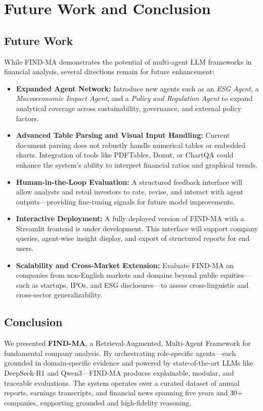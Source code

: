 \documentclass[11pt]{article}
\newcommand{\findma}{\textsc{FIND-MA}}
\begin{document}
\section{Future Work and Conclusion}
\label{sec:conclusion}
\subsection*{Future Work}
While \findma{} demonstrates the potential of multi-agent LLM frameworks in financial analysis, several directions remain for future enhancement:
\begin{itemize}
    \item \textbf{Expanded Agent Network:} Introduce new agents such as an \textit{ESG Agent}, a \textit{Macroeconomic Impact Agent}, and a \textit{Policy and Regulation Agent} to expand analytical coverage across sustainability, governance, and external policy factors.
    \item \textbf{Advanced Table Parsing and Visual Input Handling:} Current document parsing does not robustly handle numerical tables or embedded charts. Integration of tools like PDFTables, Donut, or ChartQA could enhance the system’s ability to interpret financial ratios and graphical trends.
    \item \textbf{Human-in-the-Loop Evaluation:} A structured feedback interface will allow analysts and retail investors to rate, revise, and interact with agent outputs—providing fine-tuning signals for future model improvements.
    \item \textbf{Interactive Deployment:} A fully deployed version of \findma{} with a Streamlit frontend is under development. This interface will support company queries, agent-wise insight display, and export of structured reports for end users.
    \item \textbf{Scalability and Cross-Market Extension:} Evaluate \findma{} on companies from non-English markets and domains beyond public equities—such as startups, IPOs, and ESG disclosures—to assess cross-linguistic and cross-sector generalizability.
\end{itemize}

\subsection*{Conclusion}
We presented \textbf{\findma{}}, a Retrieval-Augmented, Multi-Agent Framework for fundamental company analysis. By orchestrating role-specific agents—each grounded in domain-specific evidence and powered by state-of-the-art LLMs like DeepSeek-R1 and Qwen3—\findma{} produces explainable, modular, and traceable evaluations. The system operates over a curated dataset of annual reports, earnings transcripts, and financial news spanning five years and 30+ companies, supporting grounded and high-fidelity reasoning.
\end{document}
